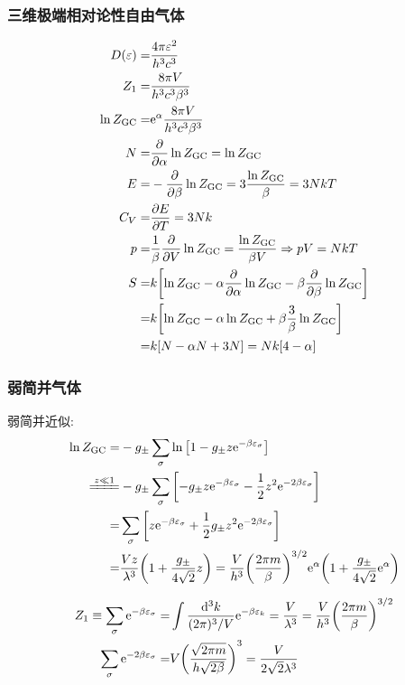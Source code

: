 \subsubsection{三维极端相对论性自由气体}

\begin{align*}
    D(\varepsilon) = & \frac{4 \pi \varepsilon^2}{h^3 c^3}\\
    Z_1 = & \frac{8 \pi V}{h^3 c^3 \beta^3}\\
    \ln{Z_{\text{GC}}} = & \mathrm{e}^{\alpha} \frac{8 \pi V}{h^3 c^3 \beta^3}\\
    N = & \pdv{\alpha} \ln{Z_{\text{GC}}} = \ln{Z_{\text{GC}}}\\
    E = & - \pdv{\beta} \ln{Z_{\text{GC}}} = 3 \frac{\ln{Z_{\text{GC}}}}{\beta} = 3 N k T\\
    C_V = & \pdv{E}{T} = 3 N k\\
    p = & \frac{1}{\beta} \pdv{V} \ln{Z_{\text{GC}}} = \frac{\ln{Z_{\text{GC}}}}{\beta V} \Rightarrow p V = N k T\\
    S = & k \qty[\ln{Z_{\text{GC}}} - \alpha \pdv{\alpha} \ln{Z_{\text{GC}}} - \beta \pdv{\beta} \ln{Z_{\text{GC}}}]\\
    = & k \qty[\ln{Z_{\text{GC}}} - \alpha \ln{Z_{\text{GC}}} + \beta \frac{3}{\beta} \ln{Z_{\text{GC}}}]\\
    = & k \qty[N - \alpha N + 3 N] = N k \qty[4 - \alpha]
\end{align*}

\subsubsection{弱简并气体}

弱简并近似: \begin{align*}
    \ln{Z_{\text{GC}}} = & - g_{\pm} \sum_{\sigma} \ln \qty[1 - g_{\pm} z \mathrm{e}^{- \beta \varepsilon_{\sigma}}]\\
    \xlongequal{z \ll 1} & - g_{\pm} \sum_{\sigma} \qty[- g_{\pm} z \mathrm{e}^{- \beta \varepsilon_{\sigma}} - \frac{1}{2} z^2 \mathrm{e}^{- 2 \beta \varepsilon_{\sigma}}]\\
    = & \sum_{\sigma} \qty[z \mathrm{e}^{- \beta \varepsilon_{\sigma}} + \frac{1}{2} g_{\pm} z^2 \mathrm{e}^{- 2 \beta \varepsilon_{\sigma}}]\\
    = & \frac{V z}{\lambda^3} \qty(1 + \frac{g_{\pm}}{4 \sqrt{2}} z) = \frac{V}{h^3} \qty(\frac{2 \pi m}{\beta})^{3/2} \mathrm{e}^{\alpha} \qty(1 + \frac{g_{\pm}}{4 \sqrt{2}} \mathrm{e}^{\alpha})
\end{align*}
\begin{framed}
\begin{align*}
    Z_1 \equiv \sum_{\sigma} \mathrm{e}^{- \beta \varepsilon_{\sigma}} = & \int \frac{\dd[3]{k}}{(2 \pi)^3 / V} \mathrm{e}^{- \beta \varepsilon_k} = \frac{V}{\lambda^3} = \frac{V}{h^3} \qty(\frac{2 \pi m}{\beta})^{3/2}\\
    \sum_{\sigma} \mathrm{e}^{- 2 \beta \varepsilon_{\sigma}} = & V \qty(\frac{\sqrt{2 \pi m}}{h \sqrt{2 \beta}})^{3} = \frac{V}{2 \sqrt{2} \lambda^3}
\end{align*}
\end{framed}

